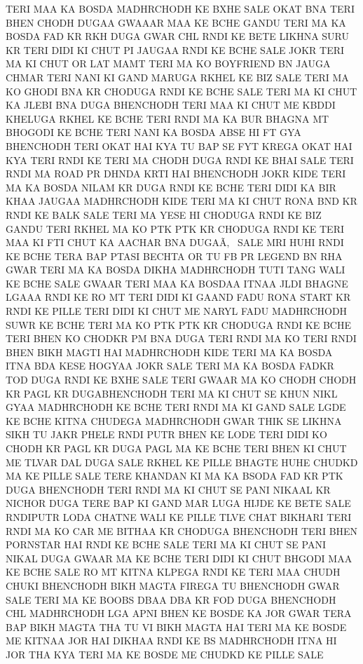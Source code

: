
TERI MAA KA BOSDA MADHRCHODH KE BXHE SALE OKAT BNA
TERI BHEN CHODH DUGAA GWAAAR MAA KE BCHE GANDU
TERI MA KA BOSDA FAD KR RKH DUGA GWAR
CHL RNDI KE BETE LIKHNA SURU KR 
TERI DIDI KI CHUT PI JAUGAA RNDI KE BCHE SALE JOKR
TERI MA KI CHUT OR LAT MAMT
TERI MA KO BOYFRIEND BN JAUGA CHMAR
TERI NANI KI GAND MARUGA RKHEL KE BIZ SALE
TERI MA KO GHODI BNA KR CHODUGA RNDI KE BCHE SALE
TERI MA KI CHUT KA JLEBI BNA DUGA BHENCHODH
TERI MAA KI CHUT ME KBDDI KHELUGA RKHEL KE BCHE
TERI RNDI MA KA BUR BHAGNA MT BHOGODI KE BCHE
TERI NANI KA BOSDA ABSE HI FT GYA BHENCHODH
TERI OKAT HAI KYA TU BAP SE FYT KREGA OKAT HAI KYA TERI RNDI KE
TERI MA CHODH DUGA RNDI KE BHAI SALE
TERI RNDI MA ROAD PR DHNDA KRTI HAI BHENCHODH JOKR KIDE
TERI MA KA BOSDA NILAM KR DUGA RNDI KE BCHE
TERI DIDI KA BIR KHAA JAUGAA MADHRCHODH KIDE
TERI MA KI CHUT RONA BND KR RNDI KE BALK SALE
TERI MA YESE HI CHODUGA RNDI KE BIZ GANDU
TERI RKHEL MA KO PTK PTK KR CHODUGA RNDI KE
TERI MAA KI FTI CHUT KA AACHAR BNA DUGAÃ‚  SALE MRI HUHI RNDI KE BCHE
TERA BAP PTASI BECHTA OR TU FB PR LEGEND BN RHA GWAR
TERI MA KA BOSDA DIKHA MADHRCHODH TUTI TANG WALI KE BCHE SALE GWAAR
TERI MAA KA BOSDAA ITNAA JLDI BHAGNE LGAAA RNDI KE RO MT
TERI DIDI KI GAAND FADU RONA START KR RNDI KE PILLE
TERI DIDI KI CHUT ME NARYL FADU MADHRCHODH SUWR KE BCHE
TERI MA KO PTK PTK KR CHODUGA RNDI KE BCHE
TERI BHEN KO CHODKR PM BNA DUGA TERI RNDI MA KO
TERI RNDI BHEN BIKH MAGTI HAI MADHRCHODH KIDE
TERI MA KA BOSDA ITNA BDA KESE HOGYAA JOKR SALE
TERI MA KA BOSDA FADKR TOD DUGA RNDI KE BXHE SALE
TERI GWAAR MA KO CHODH CHODH KR PAGL KR DUGABHENCHODH 
TERI MA KI CHUT SE KHUN NIKL GYAA MADHRCHODH KE BCHE
TERI RNDI MA KI GAND SALE LGDE KE BCHE KITNA CHUDEGA
MADHRCHODH GWAR THIK SE LIKHNA SIKH TU JAKR PHELE RNDI PUTR BHEN KE LODE
TERI DIDI KO CHODH KR PAGL KR DUGA PAGL MA KE BCHE
TERI BHEN KI CHUT ME TLVAR DAL DUGA SALE RKHEL KE PILLE 
BHAGTE HUHE CHUDKD MA KE PILLE SALE
TERE KHANDAN KI MA KA BSODA FAD KR PTK DUGA BHENCHODH
TERI RNDI MA KI CHUT SE PANI NIKAAL KR NICHOR DUGA
TERE BAP KI GAND MAR LUGA HIJDE KE BETE SALE RNDIPUTR
LODA CHATNE WALI KE PILLE TLVE CHAT BIKHARI 
TERI RNDI MA KO CAR ME BITHAA KR CHODUGA BHENCHODH
TERI BHEN PORNSTAR HAI RNDI KE BCHE SALE
TERI MA KI CHUT SE PANI NIKAL DUGA GWAAR MA KE BCHE
TERI DIDI KI CHUT BHGODI MAA KE BCHE SALE RO MT
KITNA KLPEGA RNDI KE TERI MAA CHUDH CHUKI BHENCHODH
BIKH MAGTA FIREGA TU BHENCHODH GWAR SALE
TERI MA KE BOOBS DBAA DBA KR FOD DUGA BHENCHODH
CHL MADHRCHODH LGA APNI BHEN KE BOSDE KA JOR GWAR
TERA BAP BIKH MAGTA THA TU VI BIKH MAGTA HAI
TERI MA KE BOSDE ME KITNAA JOR HAI DIKHAA RNDI KE
BS MADHRCHODH ITNA HI JOR THA KYA TERI MA KE BOSDE ME CHUDKD KE PILLE SALE
